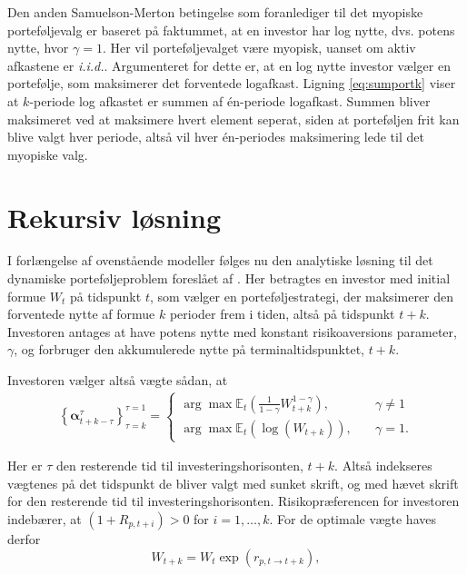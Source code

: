 \documentclass[
  a4paper,
  oneside]{memoir}
\begin{document}
Den anden Samuelson-Merton betingelse som foranlediger til det myopiske porteføljevalg er baseret på faktummet, at en investor har log nytte, dvs. potens nytte, hvor \(\gamma=1\). Her vil porteføljevalget være myopisk, uanset om aktiv afkastene er \emph{i.i.d.}. Argumenteret for dette er, at en log nytte investor vælger en portefølje, som maksimerer det forventede logafkast. Ligning \eqref{eq:sumportk} viser at \(k\)-periode log afkastet er summen af én-periode logafkast. Summen bliver maksimeret ved at maksimere hvert element seperat, siden at porteføljen frit kan blive valgt hver periode, altså vil hver én-periodes maksimering lede til det myopiske valg.

\hypertarget{rekursiv-luxf8sning}{%
\section{Rekursiv løsning}\label{rekursiv-luxf8sning}}

I forlængelse af ovenstående modeller følges nu den analytiske løsning til det dynamiske porteføljeproblem foreslået af \citep{JurVic2011}. Her betragtes en investor med initial formue \(W_t\) på tidspunkt \(t\), som vælger en porteføljestrategi, der maksimerer den forventede nytte af formue \(k\) perioder frem i tiden, altså på tidspunkt \(t+k\). Investoren antages at have potens nytte med konstant risikoaversions parameter, \(\gamma\), og forbruger den akkumulerede nytte på terminaltidspunktet, \(t+k\).

Investoren vælger altså vægte sådan, at
\begin{align}
\left\{\bm{\alpha}_{t+k-\tau}^\tau\right\}_{\tau=k}^{\tau=1}=
\begin{cases}
\arg\max\mathbb{E}_t(\frac{1}{1-\gamma}W_{t+k}^{1-\gamma}),\quad &\gamma\neq 1\\
\arg\max\mathbb{E}_t(\log(W_{t+k})),\quad &\gamma=1.
\end{cases}
\end{align}

Her er \(\tau\) den resterende tid til investeringshorisonten, \(t+k\). Altså indekseres vægtenes på det tidspunkt de bliver valgt med sunket skrift, og med hævet skrift for den resterende tid til investeringshorisonten. Risikopræferencen for investoren indebærer, at \((1+R_{p,t+i})>0\) for \(i=1,\dots,k\). For de optimale vægte haves derfor
\begin{equation}
W_{t+k}=W_t\exp(r_{p,t\to t+k}),\label{eq:formuetk}
\end{equation}
\end{document}
